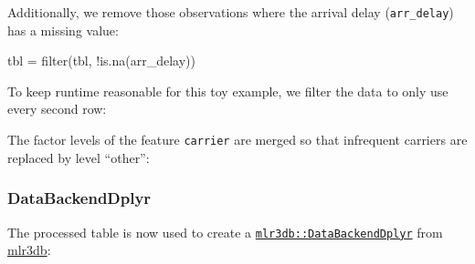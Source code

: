 \documentclass[]{article}
\newenvironment{Shaded}{}{}
\newcommand{\DataTypeTok}[1]{#1}
\newcommand{\DecValTok}[1]{#1}
\newcommand{\KeywordTok}[1]{\textcolor[rgb]{0.00,0.00,1.00}{#1}}
\newcommand{\NormalTok}[1]{#1}
\newcommand{\OperatorTok}[1]{#1}
\newcommand{\OtherTok}[1]{\textcolor[rgb]{1.00,0.25,0.00}{#1}}
\newcommand{\StringTok}[1]{\textcolor[rgb]{0.00,0.50,0.50}{#1}}
\renewenvironment{Shaded} {\begin{snugshade}\small} {\end{snugshade}}
\begin{document}
Additionally, we remove those observations where the arrival delay (\texttt{arr\_delay}) has a missing value:

\begin{Shaded}
\begin{Highlighting}[]
\NormalTok{tbl =}\StringTok{ }\KeywordTok{filter}\NormalTok{(tbl, }\OperatorTok{!}\KeywordTok{is.na}\NormalTok{(arr_delay))}
\end{Highlighting}
\end{Shaded}

To keep runtime reasonable for this toy example, we filter the data to only use every second row:

\begin{Shaded}
\end{Shaded}

The factor levels of the feature \texttt{carrier} are merged so that infrequent carriers are replaced by level ``other'':

\begin{Shaded}
\end{Shaded}

\hypertarget{databackenddplyr}{%
\subsubsection{DataBackendDplyr}\label{databackenddplyr}}

The processed table is now used to create a \href{https://mlr3db.mlr-org.com/reference/DataBackendDplyr.html}{\texttt{mlr3db::DataBackendDplyr}} from \href{https://mlr3db.mlr-org.com}{mlr3db}:
\end{document}
